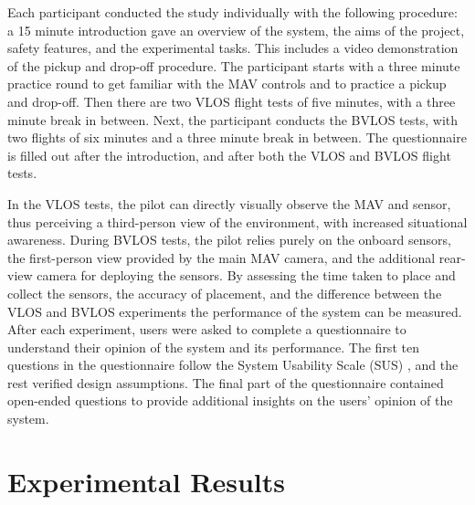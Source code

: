 Each participant conducted the study individually with the following procedure: a 15 minute introduction gave an overview of the system, the aims of the project, safety features, and the experimental tasks. This includes a video demonstration of the pickup and drop-off procedure. 
The participant starts with a three minute practice round to get familiar with the \gls{MAV} controls and to practice a pickup and drop-off. Then there are two \gls{VLOS} flight tests of five minutes, with a three minute break in between. Next, the participant conducts the \gls{BVLOS} tests, with two flights of six minutes and a three minute break in between. The questionnaire is filled out after the introduction, and after both the \gls{VLOS} and \gls{BVLOS} flight tests.


In the \gls{VLOS} tests, the pilot can directly visually observe the \gls{MAV} and sensor, thus perceiving a third-person view of the environment, with increased situational awareness. During \gls{BVLOS} tests, the pilot relies purely on the onboard sensors, the first-person view provided by the main \gls{MAV} camera, and the additional rear-view camera for deploying the sensors. By assessing the time taken to place and collect the sensors, the accuracy of placement, and the difference between the \gls{VLOS} and \gls{BVLOS} experiments  the performance of the system can be measured. After each experiment, users were asked to complete a questionnaire to understand their opinion of the system and its performance. The first ten questions in the questionnaire follow the System Usability Scale (SUS) \cite{Brooke1996}, and the rest verified design assumptions. The final part of the questionnaire contained open-ended questions to provide additional insights on the users' opinion of the system.





\section{Experimental Results}


